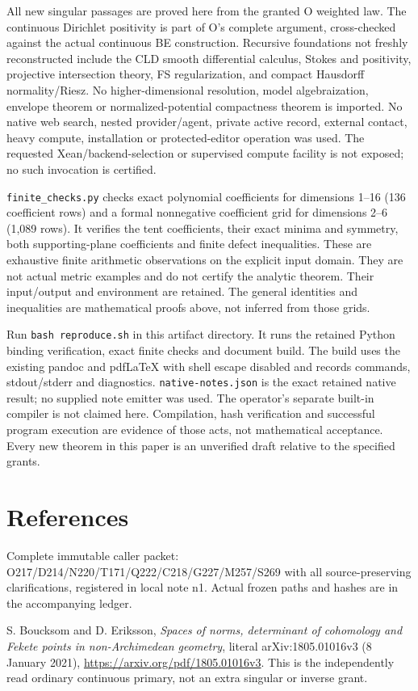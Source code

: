 \documentclass[
  11pt,
]{article}
\begin{document}
All new singular passages are proved here from the granted O weighted
law. The continuous Dirichlet positivity is part of O's complete
argument, cross-checked against the actual continuous BE construction.
Recursive foundations not freshly reconstructed include the CLD smooth
differential calculus, Stokes and positivity, projective intersection
theory, FS regularization, and compact Hausdorff normality/Riesz. No
higher-dimensional resolution, model algebraization, envelope theorem or
normalized-potential compactness theorem is imported. No native web
search, nested provider/agent, private active record, external contact,
heavy compute, installation or protected-editor operation was used. The
requested Xean/backend-selection or supervised compute facility is not
exposed; no such invocation is certified.

\texttt{finite\_checks.py} checks exact polynomial coefficients for
dimensions 1--16 (136 coefficient rows) and a formal nonnegative
coefficient grid for dimensions 2--6 (1,089 rows). It verifies the tent
coefficients, their exact minima and symmetry, both supporting-plane
coefficients and finite defect inequalities. These are exhaustive finite
arithmetic observations on the explicit input domain. They are not
actual metric examples and do not certify the analytic theorem. Their
input/output and environment are retained. The general identities and
inequalities are mathematical proofs above, not inferred from those
grids.

Run \texttt{bash\ reproduce.sh} in this artifact directory. It runs the
retained Python binding verification, exact finite checks and document
build. The build uses the existing pandoc and pdfLaTeX with shell escape
disabled and records commands, stdout/stderr and diagnostics.
\texttt{native-notes.json} is the exact retained native result; no
supplied note emitter was used. The operator's separate built-in
compiler is not claimed here. Compilation, hash verification and
successful program execution are evidence of those acts, not
mathematical acceptance. Every new theorem in this paper is an
unverified draft relative to the specified grants.

\section{References}\label{references}

Complete immutable caller packet:
O217/D214/N220/T171/Q222/C218/G227/M257/S269 with all source-preserving
clarifications, registered in local note n1. Actual frozen paths and
hashes are in the accompanying ledger.

S. Boucksom and D. Eriksson, \emph{Spaces of norms, determinant of
cohomology and Fekete points in non-Archimedean geometry}, literal
arXiv:1805.01016v3 (8 January 2021),
\url{https://arxiv.org/pdf/1805.01016v3}. This is the independently read
ordinary continuous primary, not an extra singular or inverse grant.
\end{document}
